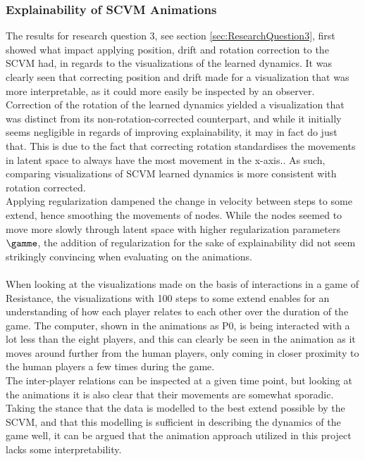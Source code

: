 \subsubsection{Explainability of SCVM Animations}
\label{sec:Discussion:Results:Explainability}
The results for research question 3, see section \ref{sec:ResearchQuestion3}, first showed what impact applying position, drift and rotation correction to the SCVM had, in regards to the visualizations of the learned dynamics.
It was clearly seen that correcting position and drift made for a visualization that was more interpretable, as it could more easily be inspected by an observer.
Correction of the rotation of the learned dynamics yielded a visualization that was distinct from its non-rotation-corrected counterpart, and while it initially seems negligible in regards of improving explainability, it may in fact do just that.
This is due to the fact that correcting rotation standardises the movements in latent space to always have the most movement in the x-axis..
As such, comparing visualizations of SCVM learned dynamics is more consistent with rotation corrected.
\\
Applying regularization dampened the change in velocity between steps to some extend, hence smoothing the movements of nodes. 
While the nodes seemed to move more slowly through latent space with higher regularization parameters $\gamme$, the addition of regularization for the sake of explainability did not seem strikingly convincing when evaluating on the animations.
\\\\
When looking at the visualizations made on the basis of interactions in a game of Resistance, the visualizations with 100 steps to some extend enables for an understanding of how each player relates to each other over the duration of the game. 
The computer, shown in the animations as P0, is being interacted with a lot less than the eight players, and this can clearly be seen in the animation as it moves around further from the human players, only coming in closer proximity to the human players a few times during the game.
\\
The inter-player relations can be inspected at a given time point, but looking at the animations it is also clear that their movements are somewhat sporadic.
Taking the stance that the data is modelled to the best extend possible by the SCVM, and that this modelling is sufficient in describing the dynamics of the game well, it can be argued that the animation approach utilized in this project lacks some interpretability.
